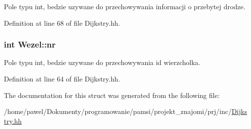 Pole typu int, bedzie uzywane do przechowywania informacji o przebytej drodze. 



Definition at line 68 of file Dijkstry.\-hh.

\hypertarget{struct_wezel_ab6bc8ea479ff25001606d388bbd7ccd0}{
\subsubsection[{nr}]{\setlength{\rightskip}{0pt plus 5cm}int Wezel\-::nr}}\label{struct_wezel_ab6bc8ea479ff25001606d388bbd7ccd0}


Pole typu int, bedzie uzywane do przechowywania id wierzcholka. 



Definition at line 64 of file Dijkstry.\-hh.



The documentation for this struct was generated from the following file\-:\begin{DoxyCompactItemize}
\item 
/home/pawel/\-Dokumenty/programowanie/pamsi/projekt\-\_\-znajomi/prj/inc/\hyperlink{_dijkstry_8hh}{Dijkstry.\-hh}\end{DoxyCompactItemize}
